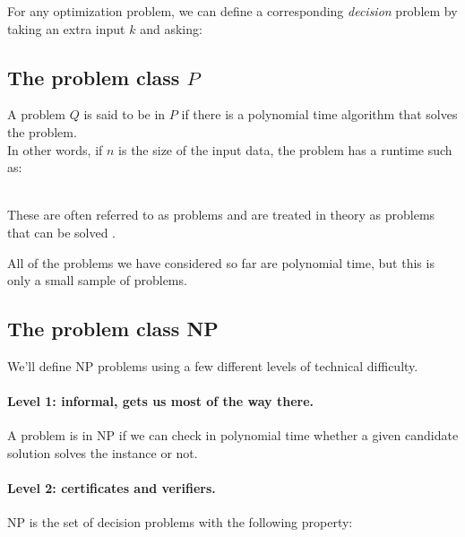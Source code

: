 \documentclass[11  pt]{article}
\begin{document}
	
		For any optimization problem, we can define a corresponding \emph{decision} problem by taking an extra input $k$ and asking:
	
	\vfill

	\newpage

	\subsection{The problem class $P$}
	A problem $Q$ is said to be in $P$ if there is a polynomial time algorithm that solves the problem. \\
	
	
	In other words, if $n$ is the size of the input data, the problem has a runtime such as: \\ \\
	
		\vs{2cm}
		
	These are often referred to as  problems and are treated in theory as problems that can be solved . \\
	
	\vs{10cm}
	
	All of the problems we have considered so far are polynomial time, but this is only a small sample of problems. \\
	
	
	\newpage
	\subsection{The problem class NP}
	We'll define NP problems using a few different levels of technical difficulty.
	
	\paragraph{Level 1: informal, gets us most of the way there.}
	A problem is in NP if we can check in polynomial time whether a given candidate solution solves the instance or not.\\
	
	
	
	
	\vs{6cm}
	
	\paragraph{Level 2: certificates and verifiers.}
	NP is the set of decision problems with the following property: \\
	
\end{document}
